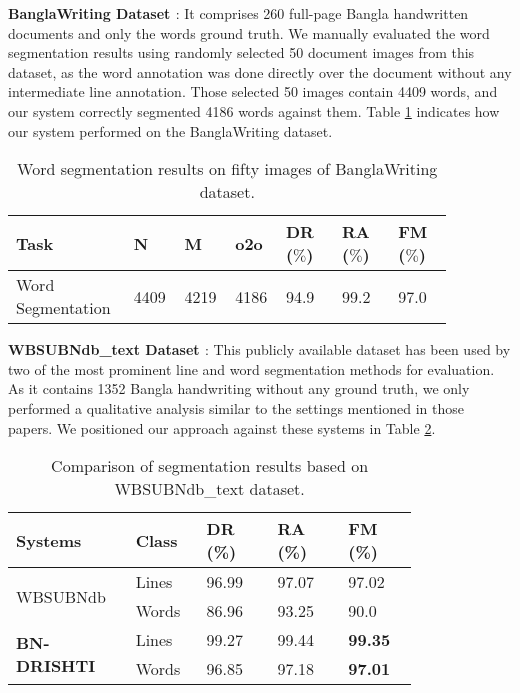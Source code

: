 \documentclass[runningheads]{llncs}
\begin{document}
\newpage
\noindent \textbf{BanglaWriting Dataset \cite{mridha2021banglawriting}}: It comprises 260 full-page Bangla handwritten documents and only the words ground truth. We manually evaluated the word segmentation results using randomly selected 50 document images from this dataset, as the word annotation was done directly over the document without any intermediate line annotation. Those selected 50 images contain 4409 words, and our system correctly segmented 4186 words against them. Table \ref{drishti-tab9} indicates how our system performed on the BanglaWriting dataset.

\begin{table}
\vspace{-4mm}
\centering
\caption{Word segmentation results on fifty images of BanglaWriting dataset.}\label{drishti-tab9}
\vspace{-2mm}
\begin{tabular}{|p{0.24\linewidth}|p{0.09\linewidth}|p{0.09\linewidth}|p{0.09\linewidth}|p{0.12\linewidth}|p{0.12\linewidth}|p{0.12\linewidth}|}
\hline
\textbf{Task} & \textbf{N} & \textbf{M} & \textbf{o2o} & \textbf{DR ($\%$)} & \textbf{RA ($\%$)} & \textbf{FM ($\%$)}\\
\hline
Word Segmentation &	4409 &	4219 &	4186 &	94.9 &	99.2 &	97.0\\
\hline
\end{tabular}
\vspace{-4mm}
\end{table}


\noindent \textbf{WBSUBNdb\_text Dataset \cite{halder2018content}}: This publicly available dataset has been used by two of the most prominent line \cite{rakshit2023generalized} and word \cite{agarwal2022word} segmentation methods for evaluation. As it contains 1352 Bangla handwriting without any ground truth, we only performed a qualitative analysis similar to the settings mentioned in those papers. We positioned our approach against these systems in Table \ref{drishti-tab10}.   

\begin{table}[h]
\vspace{-4mm}
\centering
\caption{Comparison of segmentation results based on WBSUBNdb\_text dataset.}\label{drishti-tab10}
\vspace{-1mm}
\begin{tabular}
{|p{0.20\linewidth}|p{0.15\linewidth}|p{0.15\linewidth}|p{0.15\linewidth}|p{0.15\linewidth}|}
\hline
\textbf{Systems} & \textbf{Class} & \textbf{DR (\%)} & \textbf{RA (\%)} & \textbf{FM (\%)} \\
\hline
\multirow{2}{*}{WBSUBNdb} & Lines \cite{rakshit2023generalized} & 96.99 & 97.07 & 97.02 \\ \cline{2-5}
 & Words \cite{agarwal2022word} & 86.96 & 93.25 & 90.0 \\
\hline
\multirow{2}{*}{\textbf{BN-DRISHTI}} & Lines & 99.27 & 99.44 & \textbf{99.35} \\\cline{2-5}
 & Words & 96.85 & 97.18 & \textbf{97.01} \\
 \hline
\end{tabular}
\vspace{-8mm}
\end{table}
\end{document}
